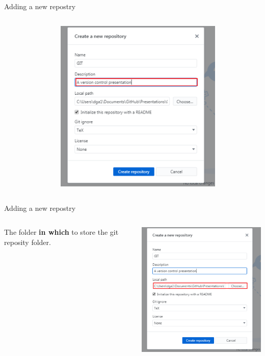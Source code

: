 \documentclass[10pt]{beamer}
\begin{document}
\begin{frame}[fragile]{Adding a new repostry}
  \begin{columns}[T]
    \begin{column}{.2\textwidth}
    \end{column}
    \begin{column}{.8\textwidth}
	\includegraphics[width=8cm]{Figs/GHD/new_repo_02}
    \end{column}
  \end{columns}
\end{frame}

\begin{frame}[fragile]{Adding a new repostry}
  \begin{columns}[T]
    \begin{column}{.2\textwidth}
	\small The folder \textbf{in which} to store the git reposity folder.
    \end{column}
    \begin{column}{.8\textwidth}
	\includegraphics[width=8cm]{Figs/GHD/new_repo_03}
    \end{column}
  \end{columns}
\end{frame}
\end{document}
